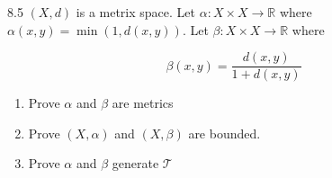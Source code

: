\documentclass{article}
\newcommand*{\T}{\mathcal{T}}
\newcommand{\R}{\mathbb{R}}
\begin{document}
\begin{PROB}{8.5}\label{Problem 8.5.}
    $(X, d)$ is a metrix space. Let $\alpha: X \times X \to \R$ where $\alpha(x, y) = \min(1, d(x,y))$. Let $\beta: X \times X \to \R$ where 
    
    \[\beta(x, y) = \frac{d(x,y)}{1 + d(x, y)}\]
    
    \begin{enumerate}
        \item Prove $\alpha$ and $\beta$ are metrics
        \item Prove $(X, \alpha)$ and $(X, \beta)$ are bounded. 
        \item Prove $\alpha$ and $\beta$ generate $\T$       
    \end{enumerate}
    
\end{PROB}
\end{document}
